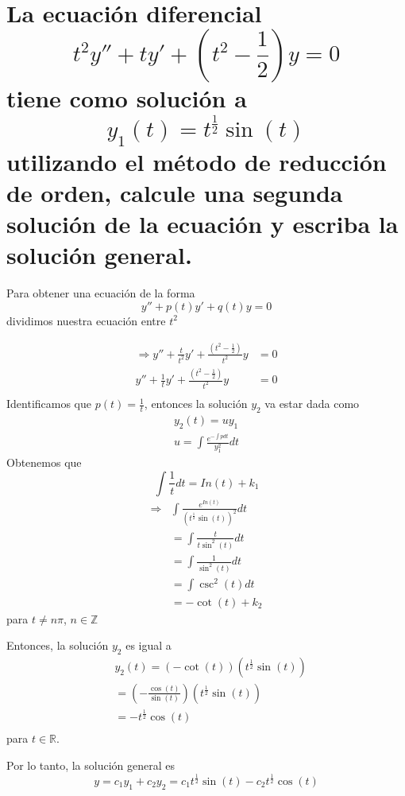 \section{La ecuación diferencial
$$ t^{2}y'' + ty' + (t^{2} - \frac{1}{2})y = 0 $$
tiene como solución a 
$$y_{1}(t)=t^{\frac{1}{2}}\sin{(t)} $$
utilizando el método de reducción de orden, calcule una segunda solución de la ecuación y escriba la solución general.}

Para obtener una ecuación de la forma $$ y'' + p(t)y' + q(t)y = 0$$ dividimos nuestra ecuación entre $t^{2}$ 

\begin{equation*}
\begin{split}
     \Rightarrow y'' + \frac{t}{t^{2}}y' + \frac{(t^{2} - \frac{1}{2})}{t^{2}}y &=0 \\
     y'' + \frac{1}{t}y' + \frac{(t^{2} - \frac{1}{2})}{t^{2}}y &=0 \\
\end{split}
\end{equation*}
Identificamos que $p(t)=\frac{1}{t}$, entonces la solución $y_{2}$ va estar dada como
\begin{equation*}
    \begin{split}
        y_{2}(t)=uy_{1} \\
        u=\int \frac{e^{-\int p dt}}{y_{1}^{2}}dt 
    \end{split}
\end{equation*}
Obtenemos que
\begin{equation*}
        \int \frac{1}{t}dt =  In(t) + k_{1}
\end{equation*}
\begin{equation*}
    \begin{split}
       \Rightarrow  & \int \frac{e^{  In(t)}}{(t^{\frac{1}{2}}\sin{(t)})^{2}}dt \\
       &= \int \frac{t}{t\sin^{2}{(t)}}dt \\
       &= \int \frac{1}{\sin^{2}{(t)}}dt \\
       &= \int \csc^{2} (t) dt \\
       &= -\cot{(t)} + k_{2}
    \end{split}
\end{equation*}
para $t\neq n\pi$, $n\in \mathbb Z $

Entonces, la solución $y_{2}$ es igual a
\begin{equation*}
\begin{split}
    &y_{2}(t)=(-\cot{(t)})(t^{\frac{1}{2}}\sin{(t)}) \\
    &= (-\frac{\cos{(t)}}{\sin{(t)}})(t^{\frac{1}{2}}\sin{(t)}) \\
    &= -t^{\frac{1}{2}}\cos{(t)}\\
\end{split}
\end{equation*}
para $t\in \mathbb R$.

Por lo tanto, la solución general es 
 \begin{equation*}
     y = c_{1}y_{1}+c_{2}y_{2}= c_{1}t^{\frac{1}{2}}\sin{(t)} - c_{2} t^{\frac{1}{2}}\cos{(t)}
 \end{equation*}